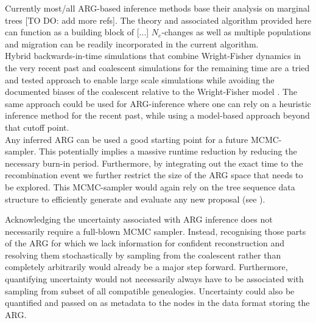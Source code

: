 \documentclass{article}
\begin{document}
Currently most/all ARG-based inference methods base their analysis on marginal 
trees \citep{hejase_2022} [TO DO: add more refs]. The theory and associated algorithm 
provided here can function as a building block of [...] 
$N_e$-changes as well as multiple populations and migration can be readily incorporated 
in the current algorithm.\\


Hybrid backwards-in-time simulations that combine Wright-Fisher dynamics in the 
very recent past and coalescent simulations for the remaining time are a tried and tested 
approach \citep{bhaskar_distortion_2014, nelson_accounting_2020} to enable large scale 
simulations while avoiding the documented biases of the coalescent relative to the 
Wright-Fisher model \citep{bhaskar_distortion_2014, wakeley_gene_2012}. The same approach 
could be used for ARG-inference where one can rely on a heuristic inference method for 
the recent past, while using a model-based approach beyond that cutoff point.\\

Any inferred ARG can be used a good starting point 
for a future MCMC-sampler. This potentially implies a massive runtime reduction by 
reducing the necessary burn-in period. Furthermore, by integrating out the exact time 
to the recombination event we further restrict the size of the ARG space that needs to 
be explored. This MCMC-sampler would again rely on the tree sequence data structure to 
efficiently generate and evaluate any new proposal (see \citep{mahmoudi_bayesian_2022}).

Acknowledging the uncertainty associated with ARG inference does not 
necessarily require a full-blown MCMC sampler. Instead, recognising those parts of 
the ARG for which we lack information for confident reconstruction and resolving 
them stochastically by sampling from the coalescent rather than completely arbitrarily 
would already be a major step forward.
Furthermore, quantifying uncertainty would not necessarily always have to be associated 
with sampling from subset of all compatible genealogies. Uncertainty could also 
be quantified and passed on as metadata to the nodes in the data format storing the ARG.
\end{document}
